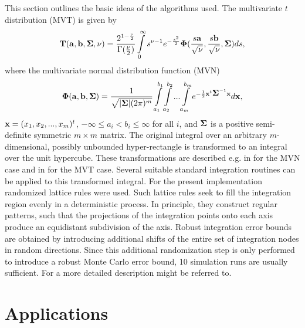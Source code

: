 \documentclass[11pt]{amsart}
\newcommand{\ba}{{\bf a}}
\newcommand{\bb}{{\bf b}}
\newcommand{\bx}{{\bf x}}
\newcommand{\bT}{{\bf T}}
\newcommand{\Sig}{\mbox{\boldmath $\Sigma$}}
\newcommand{\Ph}{\mbox{\boldmath $\Phi$}}
\begin{document}
This section outlines the basic ideas of the algorithms used. The
multivariate $t$ distribution (MVT) is given by $$ \bT(\ba, \bb,
\Sig, \nu) = \frac{2^{1-\frac{\nu}{2}}}{\Gamma(\frac{\nu}{2})}
\int\limits_0^{\infty}s^{\nu-1}e^{-\frac{s^2}{2}}
\Ph(\frac{s\ba}{\sqrt{\nu}},\frac{s\bb}{\sqrt{\nu}},\Sig) ds, $$
where the multivariate normal distribution function (MVN) $$
\Ph(\ba,\bb, \Sig) = \frac{1}{\sqrt{|\Sig| (2\pi)^m}}
\int\limits_{a_1}^{b_1} \int\limits_{a_2}^{b_2} ...
\int\limits_{a_m}^{b_m} e^{- \frac{1}{2} \bx^t \Sig^{-1} \bx}
d\bx, $$ $\bx = (x_1, x_2, ..., x_m)^t$, $-\infty \leq a_i < b_i
\leq \infty$ for all $i$, and $\Sig$ is a positive semi-definite
symmetric $m \times m$ matrix. The original integral over an
arbitrary $m$-dimensional, possibly unbounded hyper-rectangle is
transformed to an integral over the unit hypercube. These
transformations are described e.g. in \cite{numerical-:1992} for the MVN
case and in \cite{numerical-:1999} for the MVT case. Several
suitable standard integration routines can be applied to this
transformed integral. For the present implementation randomized
lattice rules were used. Such lattice rules seek to fill the
integration region evenly in a deterministic process. In
principle, they construct regular patterns, such that the
projections of the integration points onto each axis produce an
equidistant subdivision of the axis. Robust integration error
bounds are obtained by introducing additional shifts of the
entire set of integration nodes in random directions. Since this
additional randomization step is only performed to introduce a
robust Monte Carlo error bound, 10 simulation runs are usually
sufficient. For a more detailed description \cite{numerical-:1999}
might be referred to.

\section{Applications \label{appl}}
\end{document}

